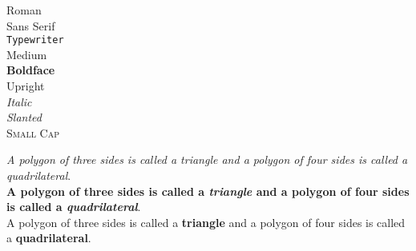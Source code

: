 \documentclass{article}
\begin{document}
    \begin{center}

    \textrm{Roman} \\
    \textsf{Sans Serif} \\
    \texttt{Typewriter} \\[10 pt]

    \textmd{Medium} \\
    \textbf{Boldface} \\[10 pt]

    \textup{Upright} \\
    \textit{Italic} \\
    \textsl{Slanted} \\
    \textsc{Small Cap} \\[10 pt]

    \end{center}

\noindent \textit{A polygon of three sides is called a \emph{triangle} and a polygon of four sides is called a \emph{quadrilateral}}.\\[5 pt]

\noindent \textbf{A polygon of three sides is called a \emph{triangle} and a polygon of four sides is called a \emph{quadrilateral}}.\\[5 pt]

\noindent A polygon of three sides is called a {\bfseries triangle} and a polygon of four sides is called a {\bfseries quadrilateral}.
\end{document}
